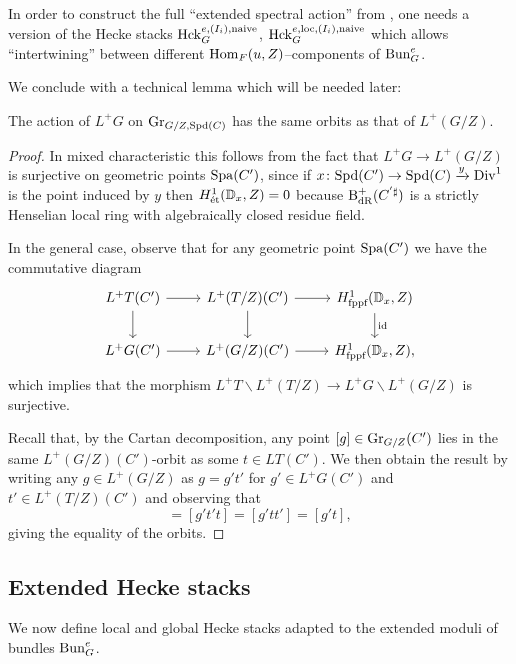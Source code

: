 In order to construct the full ``extended spectral action'' from \cite[Conjecture 12.8]{Fargues22}, one needs a version of the Hecke stacks $\mathrm{Hck}_{G}^{e,(I_{i}),\textnormal{naive}}$, $\mathrm{Hck}_{G}^{e,\mathrm{loc},(I_{i}),\textnormal{naive}}$ which allows ``intertwining'' between different $\mathrm{Hom}_{F}(u,Z)$--components of $\mathrm{Bun}_{G}^{e}$.

We conclude with a technical lemma which will be needed later:

\begin{lem}\label{lem:Grgerbe}
    The action of $L^{+}G$ on $\textnormal{Gr}_{G/Z,\mathrm{Spd}(C)}$ has the same orbits as that of $L^{+}(G/Z)$.
\end{lem}

\begin{proof}
    In mixed characteristic this follows from the fact that $L^{+}G \to L^{+}(G/Z)$ is surjective on geometric points $\mathrm{Spa}(C')$, since if $x \colon \mathrm{Spd}(C') \to \mathrm{Spd}(C) \xrightarrow{y} \mathrm{Div}^{1}$ is the point induced by $y$ then $H^{1}_{\textnormal{\'{e}t}}(\mathbb D_{x}, Z) = 0$ because $\mathrm{B}_{\mathrm{dR}}^{+}(C^{'\sharp})$ is a strictly Henselian local ring with algebraically closed residue field.

    In the general case, observe that for any geometric point $\mathrm{Spa}(C')$ we have the commutative diagram
    \[ 
\begin{tikzcd}
    L^{+}T(C') \arrow{r} \arrow{d} & L^{+}(T/Z)(C') \arrow{r} \arrow{d} & H^{1}_{\tn{fppf}}(\bbD_{x}, Z) \arrow["\tn{id}"]{d} \\
     L^{+}G(C') \arrow{r} & L^{+}(G/Z)(C') \arrow{r} & H^{1}_{\tn{fppf}}(\bbD_{x}, Z),
\end{tikzcd}
    \]
    which implies that the morphism $L^{+}T \backslash L^{+}(T/Z) \to L^{+}G \backslash L^{+}(G/Z)$ is surjective. 

   Recall that, by the Cartan decomposition, any point $[g] \in \textnormal{Gr}_{G/Z}(C')$ lies in the same $L^{+}(G/Z)(C')$-orbit as some $t \in LT(C')$. We then obtain the result by writing any $g \in L^{+}(G/Z)$ as $g = g't'$ for $g' \in L^{+}G(C')$ and $t' \in L^{+}(T/Z)(C')$ and observing that
   \begin{equation*}
       [gt] = [g't't] = [g'tt'] = [g't],
   \end{equation*}
giving the equality of the orbits.
\end{proof}

\subsection{Extended Hecke stacks}\label{sec:extendedheckedef}
We now define local and global Hecke stacks adapted to the extended moduli of bundles $\mathrm{Bun}_{G}^{e}$. 

